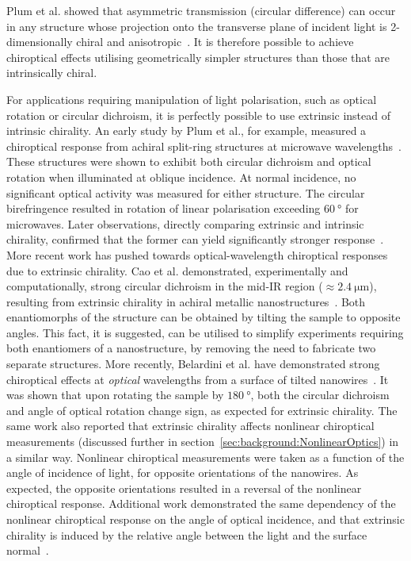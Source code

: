 Plum et al. showed that asymmetric transmission (circular difference) can occur in any structure whose projection onto the transverse plane of incident light is 2-dimensionally chiral and anisotropic~\cite{Plum2011}. It is therefore possible to achieve chiroptical effects utilising geometrically simpler structures than those that are intrinsically chiral.

For applications requiring manipulation of light polarisation, such as optical rotation or circular dichroism, it is perfectly possible to use extrinsic instead of intrinsic chirality. An early study by Plum et al., for example, measured a chiroptical response from achiral split-ring structures at microwave wavelengths~\cite{Plum2009c}. These structures were shown to exhibit both circular dichroism and optical rotation when illuminated at oblique incidence. At normal incidence, no significant optical activity was measured for either structure. The circular birefringence resulted in rotation of linear polarisation exceeding $\SI{60}{\degree}$ for microwaves. Later observations, directly comparing extrinsic and intrinsic chirality, confirmed that the former can yield significantly stronger response~\cite{Maoz2012a}. 
More recent work has pushed towards optical-wavelength chiroptical responses due to extrinsic chirality.
Cao et al. demonstrated, experimentally and computationally, strong circular dichroism in the mid-IR region ($\approx\SI{2.4}{\micro\m}$), resulting from extrinsic chirality in achiral metallic nanostructures~\cite{Cao2014}. Both enantiomorphs of the structure can be obtained by tilting the sample to opposite angles. This fact, it is suggested, can be utilised to simplify experiments requiring both enantiomers of a nanostructure, by removing the need to fabricate two separate structures.
More recently, Belardini et al. have demonstrated strong chiroptical effects at \textit{optical} wavelengths from a surface of tilted nanowires~\cite{Belardini2016}. It was shown that upon rotating the sample by $\SI{180}{\degree}$, both the circular dichroism and angle of optical rotation change sign, as expected for extrinsic chirality. 
The same work also reported that extrinsic chirality affects nonlinear chiroptical measurements (discussed further in section~\ref{sec:background:NonlinearOptics}) in a similar way. Nonlinear chiroptical measurements were taken as a function of the angle of incidence of light, for opposite orientations of the nanowires. As expected, the opposite orientations resulted in a reversal of the nonlinear chiroptical response. Additional work demonstrated the same dependency of the nonlinear chiroptical response on the angle of optical incidence, and that extrinsic chirality is induced by the relative angle between the light and the surface normal~\cite{Belardini2015}.

